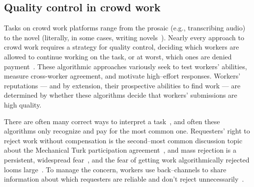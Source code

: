 \documentclass[street-level_algorithms]{subfiles}
\begin{document}
\subsection{Quality control in crowd work}\label{sec:crowdwork}

Tasks on crowd work platforms range from the prosaic
(e.g., transcribing audio)
to the novel
(literally, in some cases, writing novels~\cite{Kim2017}).
Nearly every approach to crowd work requires a strategy for quality control,
deciding which workers are allowed to continue working on the task,
or at worst,
which ones are denied payment~\cite{Bigham2014,Sheng:2008:GLI:1401890.1401965,mitraComparingStrategies,incentivesShaw}.
These algorithmic approaches variously seek to
test workers' abilities,
measure cross-worker agreement, and
motivate high--effort responses.
Workers' reputations
--- and by extension, their prospective abilities to find work ---
are determined by whether these algorithms decide that workers' submissions are high quality.

There are often many correct ways to interpret a task~\cite{kairam2016parting}, and
often these algorithms only recognize and pay for the most common one.
Requesters' right to reject work without compensation is
the second--most common discussion topic about the Mechanical Turk participation agreement~\cite{takingAHITMcInnis}, and
mass rejection is a persistent, widespread fear~\cite{martin2014being}, and
the fear of getting work algorithmically rejected looms large~\cite{takingAHITMcInnis}.
To manage the concern, workers use back--channels
to share information about which requesters are reliable and don't reject unnecessarily~\cite{crowdcollab,turkopticon}.
\end{document}
